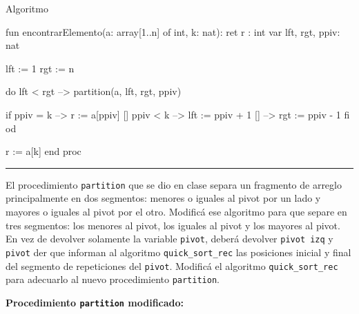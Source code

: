 \begin{codebox}{Algoritmo}
\begin{pascallike}
fun encontrarElemento(a: array[1..n] of int, k: nat): ret r : int
    var lft, rgt, ppiv: nat

    lft := 1
    rgt := n

    do lft < rgt -->
        partition(a, lft, rgt, ppiv)

        if ppiv = k -->
            r := a[ppiv]
        [] ppiv < k -->
            lft := ppiv + 1
        [] -->
            rgt := ppiv - 1
        fi
    od

    r := a[k]
end proc
\end{pascallike}
\end{codebox}

\begin{center}
    \rule{\textwidth}{0.4pt}
\end{center}

El procedimiento \texttt{partition} que se dio en clase separa un fragmento de arreglo principalmente en dos segmentos: menores o iguales al pivot por un lado y mayores o iguales al pivot por el otro. Modificá ese algoritmo para que separe en tres segmentos: los menores al pivot, los iguales al pivot y los mayores al pivot. En vez de devolver solamente la variable \texttt{pivot}, deberá devolver \texttt{pivot izq} y \texttt{pivot} der que informan al algoritmo \texttt{quick\_sort\_rec} las posiciones inicial y final del segmento de repeticiones del \texttt{pivot}. Modificá el algoritmo \texttt{quick\_sort\_rec} para adecuarlo al nuevo procedimiento \texttt{partition}.

\textbf{Procedimiento \texttt{partition} modificado:}

